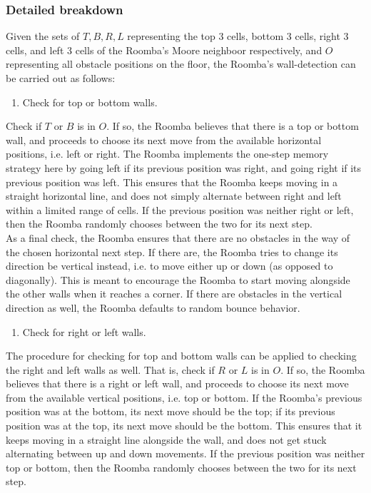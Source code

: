 \documentclass[11pt]{article}
\providecommand{\tightlist}{%
      \setlength{\itemsep}{0pt}\setlength{\parskip}{0pt}}
\begin{document}
\subsubsection{Detailed breakdown}

Given the sets of \(T, B, R, L\) representing the top 3 cells, bottom 3
cells, right 3 cells, and left 3 cells of the Roomba's Moore neighboor
respectively, and \(O\) representing all obstacle positions on the
floor, the Roomba's wall-detection can be carried out as follows:

\begin{enumerate}
\def\labelenumi{\arabic{enumi})}
\tightlist
\item
  Check for top or bottom walls.
\end{enumerate}

Check if \(T\) or \(B\) is in \(O\). If so, the Roomba believes that
there is a top or bottom wall, and proceeds to choose its next move from
the available horizontal positions, i.e. left or right. The Roomba
implements the one-step memory strategy here by going left if its
previous position was right, and going right if its previous position
was left. This ensures that the Roomba keeps moving in a straight
horizontal line, and does not simply alternate between right and left
within a limited range of cells. If the previous position was neither
right or left, then the Roomba randomly chooses between the two for its
next step.\\

As a final check, the Roomba ensures that there are no obstacles in the
way of the chosen horizontal next step. If there are, the Roomba tries
to change its direction be vertical instead, i.e. to move either up or
down (as opposed to diagonally). This is meant to encourage the Roomba
to start moving alongside the other walls when it reaches a corner. If
there are obstacles in the vertical direction as well, the Roomba
defaults to random bounce behavior.

\begin{enumerate}
\def\labelenumi{\arabic{enumi})}
\setcounter{enumi}{1}
\tightlist
\item
  Check for right or left walls.
\end{enumerate}

The procedure for checking for top and bottom walls can be applied to
checking the right and left walls as well. That is, check if \(R\) or
\(L\) is in \(O\). If so, the Roomba believes that there is a right or
left wall, and proceeds to choose its next move from the available
vertical positions, i.e. top or bottom. If the Roomba's previous
position was at the bottom, its next move should be the top; if its
previous position was at the top, its next move should be the bottom.
This ensures that it keeps moving in a straight line alongside the wall,
and does not get stuck alternating between up and down movements. If the
previous position was neither top or bottom, then the Roomba randomly
chooses between the two for its next step.\\
\end{document}
